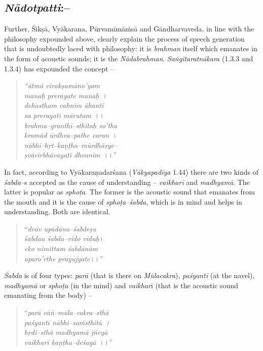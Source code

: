 \subsection*{\textit{Nādotpatti}:–}

Further, Śikṣā, Vyākarana, Pūrvamīmāṁsā and Gāndharvaveda\textit{,} in line with the philosophy expounded above, clearly explain the process of speech generation that is undoubtedly laced with philosophy: it is \textit{brahman} itself which emanates in the form of acoustic sounds; it is the \textit{Nādabrahman}. \textit{Saṅgītaratnākara} (1.3.3 and 1.3.4) has expounded the concept –

\begin{verse}
\textit{“ātmā vivakṣamāno’yam}\\\textit{manaḥ prerayate manaḥ}~।\\\textit{dehastham vahnim āhanti}\\\textit{sa prerayati mārutam}~।।\\\textit{brahma–granthi–sthitaḥ so’tha}\\\textit{kramād ūrdhva–pathe caran}~।\\\textit{nābhi–hṛt–kaṇṭha–mūrdhāsye–}\\\textit{ṣvāvirbhāvayati dhvanim}~।।”
\end{verse}

In fact, according to Vyākaraṇadarśana (\textit{Vākyapadīya} 1.44) there are two kinds of \textit{śabda}–s accepted as the cause of understanding – \textit{vaikharī} and \textit{madhyamā}. The latter is popular as \textit{sphoṭa}. The former is the acoustic sound that emanates from the mouth and it is the cause of \textit{sphoṭa–śabda}, which is in mind and helps in understanding. Both are identical.

\begin{verse}
“\textit{dvāv upādāna–śabdeṣu}\\\textit{śabdau śabda–vido viduḥ}।\\\textit{eko nimittam śabdānām}\\\textit{aparo’rthe prayujyate}।।”
\end{verse}

\textit{Śabda} is of four types: \textit{parā} (that is there on \textit{Mūlacakra}), \textit{paśyantī} (at the navel), \textit{madhyamā} or \textit{sphoṭa} (in the mind) and \textit{vaikhar}ī (that is the acoustic sound emanating from the body) –

\begin{verse}
“\textit{parā vāṅ–mūla–cakra–sthā}\\\textit{paśyantī nābhi–saṁsthitā~।}\\\textit{hṛdi–sthā madhyamā jñeyā}\\\textit{vaikharī kaṇṭha–deśagā}~।।” 
\end{verse}

